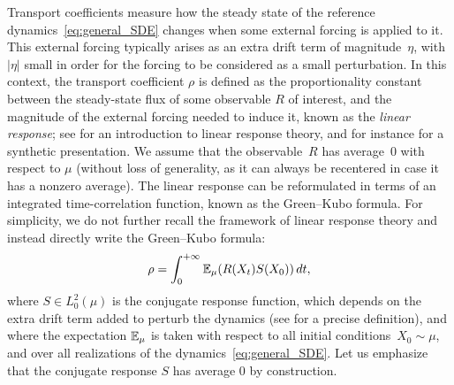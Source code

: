 Transport coefficients measure how the steady state of the reference dynamics~\eqref{eq:general_SDE} changes when some external forcing is applied to it. This external forcing typically arises as an extra drift term of magnitude~$\eta$, with~$|\eta|$ small in order for the forcing to be considered as a small perturbation. In this context, the transport coefficient $\rho$ is defined as the proportionality constant between the steady-state flux of some observable $R$ of interest, and the magnitude of the external forcing needed to induce it, known as the \emph{linear response}; see \cite[Chapter 8]{chandler1987} for an introduction to linear response theory, and for instance \cite[Section 2]{spacek2023} for a synthetic presentation. We assume that the observable~$R$ has average~0 with respect to $\mu$ (without loss of generality, as it can always be recentered in case it has a nonzero average). The linear response can be reformulated in terms of an integrated time-correlation function, known as the Green--Kubo formula. For simplicity, we do not further recall the framework of linear response theory and instead directly write the Green--Kubo formula:
%
\begin{align}
	\rho = \int_0^{+\infty} \E_\mu(R(X_t) S(X_0)) \, dt,%
	\label{eq:gk}
\end{align}
%
where $S \in L^2_0(\mu)$ is the conjugate response function, which depends on the extra drift term added to perturb the dynamics (see \cite[Section 5.2.3]{lelievre2016} for a precise definition), and where the expectation $\mathbb{E}_\mu$ is taken with respect to all initial conditions~$X_0\sim \mu$, and over all realizations of the dynamics~\eqref{eq:general_SDE}. Let us emphasize that the conjugate response $S$ has average 0 by construction.

